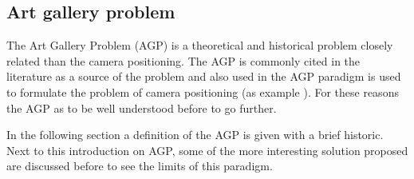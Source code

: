 \subsection{Art gallery problem} \label{sec:AGP}



The Art Gallery Problem (AGP) is a theoretical and historical problem closely related than the camera positioning. The AGP is commonly cited  in the literature as a source of the problem and also used in the AGP paradigm is used to formulate the problem of camera positioning (as example \citep{44*chvatal1975,53*packer2008,149*mavrinac2013}). For these reasons the AGP as to be well understood before to go further.


In the following section a definition of the AGP is given with a brief historic. Next to this introduction on AGP, some of the more interesting solution proposed are discussed before to see the limits of this paradigm.



